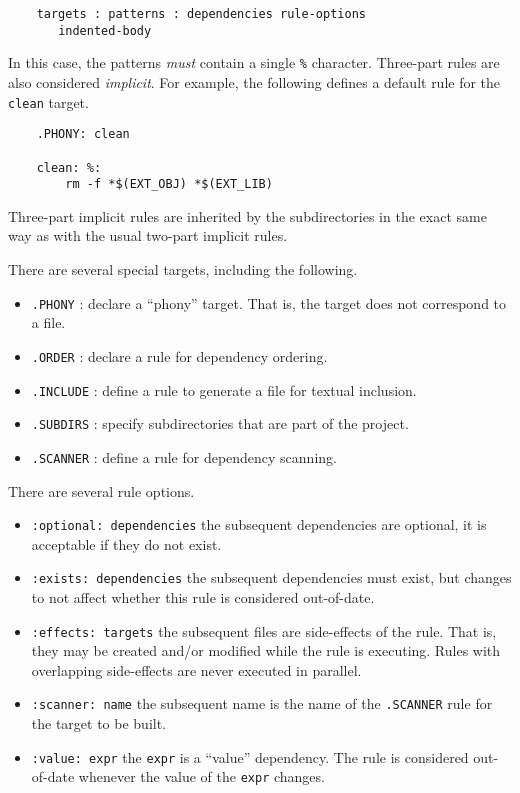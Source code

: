 \begin{verbatim}
    targets : patterns : dependencies rule-options
       indented-body
\end{verbatim}

In this case, the patterns \emph{must} contain a single \verb+%+ character. Three-part rules are
also considered \emph{implicit}. For example, the following defines a default rule for the
\verb+clean+ target.

\begin{verbatim}
    .PHONY: clean
    
    clean: %:
        rm -f *$(EXT_OBJ) *$(EXT_LIB)
\end{verbatim}

Three-part implicit rules are inherited by the subdirectories in the exact same way as with
the usual two-part implicit rules.

There are several special targets, including the following.

\begin{itemize}
\item \verb+.PHONY+ : declare a ``phony'' target.  That is, the target does not correspond to a file.
\item \verb+.ORDER+ : declare a rule for dependency ordering.
\item \verb+.INCLUDE+ : define a rule to generate a file for textual inclusion.
\item \verb+.SUBDIRS+ : specify subdirectories that are part of the project.
\item \verb+.SCANNER+ : define a rule for dependency scanning.
\end{itemize}

There are several rule options.

\begin{itemize}
\item \verb+:optional: dependencies+ the subsequent dependencies are optional, it is acceptable if they do not exist.
\item \verb+:exists: dependencies+ the subsequent dependencies must exist, but changes to not affect
whether this rule is considered out-of-date.
\item \verb+:effects: targets+ the subsequent files are side-effects of the rule.  That is, they may be
created and/or modified while the rule is executing.  Rules with overlapping side-effects are never
executed in parallel.
\item \verb+:scanner: name+ the subsequent name is the name of the \verb+.SCANNER+ rule for the target to be built.
\item \verb+:value: expr+ the \verb+expr+ is a ``value'' dependency.  The rule is considered
out-of-date whenever the value of the \verb+expr+ changes.
\end{itemize}

